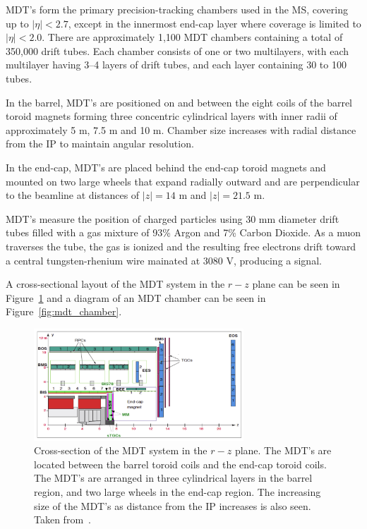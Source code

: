 
MDT's form the primary precision-tracking chambers used in the MS, covering up to $|\eta| < 2.7$, except in the innermost end-cap layer where coverage is limited to $|\eta| < 2.0$. There are approximately 1,100 MDT chambers containing a total of 350,000 drift tubes. Each chamber consists of one or two multilayers, with each multilayer having 3--4 layers of drift tubes, and each layer containing 30 to 100 tubes.

In the barrel, MDT's are positioned on and between the eight coils of the barrel toroid magnets forming three concentric cylindrical layers with inner radii of approximately 5 m, 7.5 m and 10 m. Chamber size increases with radial distance from the IP to maintain angular resolution.

In the end-cap, MDT's are placed behind the end-cap toroid magnets and mounted on two large wheels that expand radially outward and are perpendicular to the beamline at distances of $|z| = 14$ m and $|z| = 21.5$ m.

MDT's measure the position of charged particles using 30 mm diameter drift tubes filled with a gas mixture of 93\% Argon and 7\% Carbon Dioxide. As a muon traverses the tube, the gas is ionized and the resulting free electrons drift toward a central tungsten-rhenium wire mainated at 3080 V, producing a signal.

A cross-sectional layout of the MDT system in the $r-z$ plane can be seen in Figure~\ref{fig:atlas_mdt_cross_section} and a diagram of an MDT chamber can be seen in Figure~\ref{fig:mdt_chamber}.

\begin{figure}[htp]
    \centering
    \includegraphics[width=0.7\textwidth]{figures/atlas/atlas_ms_run3_layout.png}
    \caption{Cross-section of the MDT system in the $r-z$ plane. The MDT's are located between the barrel toroid coils and the end-cap toroid coils. The MDT's are arranged in three cylindrical layers in the barrel region, and two large wheels in the end-cap region. The increasing size of the MDT's as distance from the IP increases is also seen. Taken from~\cite{atlas_mdt_cross_section}.}\label{fig:atlas_mdt_cross_section}
\end{figure}

